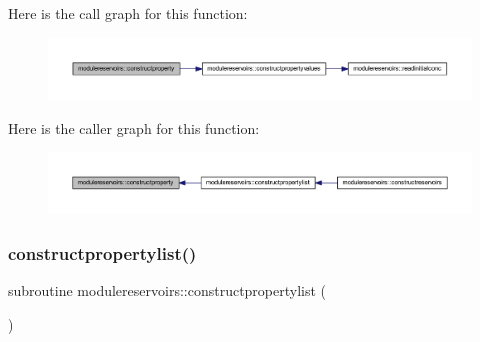 Here is the call graph for this function\+:\nopagebreak
\begin{figure}[H]
\begin{center}
\leavevmode
\includegraphics[width=350pt]{namespacemodulereservoirs_a67e585ed4eb36afe43471887a3a9744c_cgraph}
\end{center}
\end{figure}
Here is the caller graph for this function\+:\nopagebreak
\begin{figure}[H]
\begin{center}
\leavevmode
\includegraphics[width=350pt]{namespacemodulereservoirs_a67e585ed4eb36afe43471887a3a9744c_icgraph}
\end{center}
\end{figure}
\mbox{\label{namespacemodulereservoirs_a96a0b204df7b8cbf62057d7868d8aaa1}} 
\subsubsection{\texorpdfstring{constructpropertylist()}{constructpropertylist()}}
{\footnotesize\ttfamily subroutine modulereservoirs\+::constructpropertylist (\begin{DoxyParamCaption}{ }\end{DoxyParamCaption})\hspace{0.3cm}{\ttfamily [private]}}

